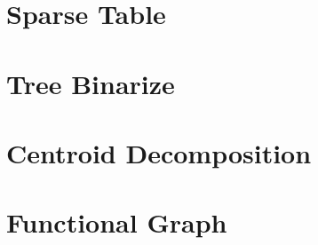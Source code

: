 \section{Sparse Table}
\section{Tree Binarize}
\section{Centroid Decomposition}
\section{Functional Graph}
